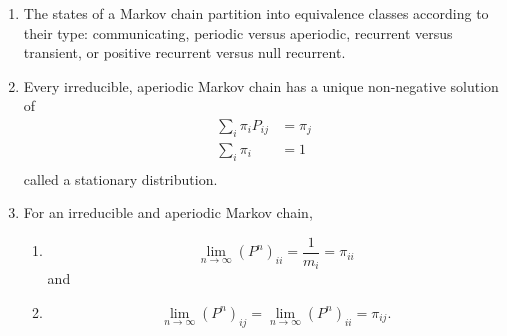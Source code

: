 \documentclass[12pt]{article}
\begin{document}
\begin{enumerate}
    \item
        The states of a Markov chain partition into equivalence classes
        according to their type:  communicating, periodic versus
        aperiodic, recurrent versus transient, or positive recurrent versus null
        recurrent.
    \item
        Every irreducible, aperiodic Markov chain has a unique
        non-negative solution of
        \begin{align*}
            \sum\limits_{i} \pi_{i} P_{ij} &= \pi_{j} \\
            \sum\limits_{i} \pi_{i} &= 1 \\
        \end{align*}
        called a stationary distribution.
    \item
        For an irreducible and aperiodic Markov chain,
        \begin{enumerate}
            \item
                \[
                    \lim_{n \to \infty} (P^{n})_{ii} = \frac{1}{m_i} =
                    \pi_{ii}
                \] and
            \item
                \[
                    \lim_{n \to \infty} (P^{n})_{ij} = \lim_{n \to
                    \infty} (P^ {n})_{ii} =\pi_{ij}.
                \]
        \end{enumerate}
\end{enumerate}

\hr

\end{document}
